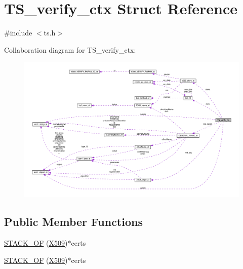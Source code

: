 \hypertarget{struct_t_s__verify__ctx}{}\section{T\+S\+\_\+verify\+\_\+ctx Struct Reference}
\label{struct_t_s__verify__ctx}


{\ttfamily \#include $<$ts.\+h$>$}



Collaboration diagram for T\+S\+\_\+verify\+\_\+ctx\+:\nopagebreak
\begin{figure}[H]
\begin{center}
\leavevmode
\includegraphics[width=350pt]{struct_t_s__verify__ctx__coll__graph}
\end{center}
\end{figure}
\subsection*{Public Member Functions}
\begin{DoxyCompactItemize}
\item 
\hyperlink{struct_t_s__verify__ctx_a51f0ddafb33cce3c0ce72817d32f1baa}{S\+T\+A\+C\+K\+\_\+\+OF} (\hyperlink{crypto_2ossl__typ_8h_a4f666bde6518f95deb3050c54b408416}{X509})$\ast$certs
\item 
\hyperlink{struct_t_s__verify__ctx_a51f0ddafb33cce3c0ce72817d32f1baa}{S\+T\+A\+C\+K\+\_\+\+OF} (\hyperlink{crypto_2ossl__typ_8h_a4f666bde6518f95deb3050c54b408416}{X509})$\ast$certs
\end{DoxyCompactItemize}
